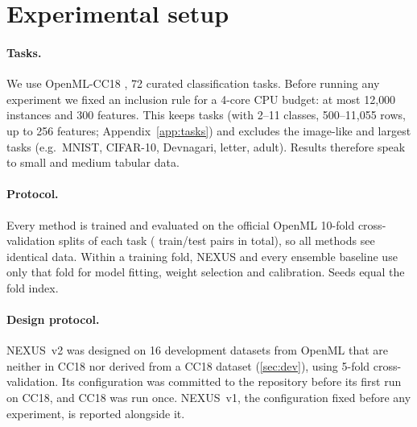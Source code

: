 \section{Experimental setup}
\label{sec:setup}

\paragraph{Tasks.} We use OpenML-CC18 \citep{bischl2021openml,vanschoren2013openml},
72 curated classification tasks. Before running any experiment we fixed an
inclusion rule for a 4-core CPU budget: at most 12{,}000 instances and 300
features. This keeps \NTasks{} tasks (with 2--11 classes, 500--11{,}055 rows, up to
256 features; Appendix~\ref{app:tasks}) and excludes the image-like and largest
tasks (e.g.\ MNIST, CIFAR-10, Devnagari, letter, adult). Results therefore speak
to small and medium tabular data.

\paragraph{Protocol.} Every method is trained and evaluated on the official
OpenML 10-fold cross-validation splits of each task (\NFolds{} train/test pairs in
total), so all methods see identical data. Within a training fold, NEXUS and
every ensemble baseline use only that fold for model fitting, weight
selection and calibration. Seeds equal the fold index.

\paragraph{Design protocol.} NEXUS~v2 was designed on 16 development datasets
from OpenML that are neither in CC18 nor derived from a CC18 dataset
(\cref{sec:dev}), using 5-fold cross-validation. Its configuration was committed
to the repository before its first run on CC18, and CC18 was run once. NEXUS~v1,
the configuration fixed before any experiment, is reported alongside it.

